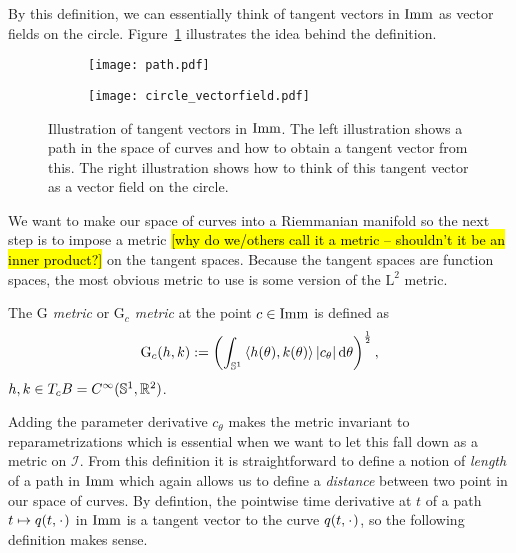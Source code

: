 By this definition, we can essentially think of tangent vectors in $\mathop{}\!\mathrm{Imm}$ as vector fields on the circle. Figure~\ref{fig:def-tang-imm} illustrates the idea behind the definition.

\begin{figure}
  \centering
  \begin{subfigure}{.49\textwidth}
    \centering
    \texttt{[image: path.pdf]}
  \end{subfigure}
  \begin{subfigure}{.49\textwidth}
    \centering
    \texttt{[image: circle\_vectorfield.pdf]}
  \end{subfigure}
  \caption{Illustration of tangent vectors in $\mathop{}\!\mathrm{Imm}$. The left illustration shows a path in the space of curves and how to obtain a tangent vector from this. The right illustration shows how to think of this tangent vector as a vector field on the circle.}
  \label{fig:def-tang-imm}
\end{figure}

We want to make our space of curves into a Riemmanian manifold so the next step is to impose a metric
\hl{[why do we/others call it a metric -- shouldn't it be an inner product?]}
on the tangent spaces. Because the tangent spaces are function spaces, the most obvious metric to use is some version of the $\mathrm{L}^2$ metric.

\begin{definition}
  The \textit{$\mathrm{G}$ metric} or \textit{$\mathrm{G}_c$ metric} at the point $c \in \mathop{}\!\mathrm{Imm}$ is defined as
  \begin{equation*}
    \mathrm{G}_c(h,k) :=
    \left(
      \int_{\mathbb{S}^{1}} \left\langle{h(\theta)
          , k(\theta)}\right\rangle |c_{\theta}| \mathop{}\!\mathrm{d} \theta
    \right)^{\frac{1}{2}},
  \end{equation*}
  $h,k \in T_cB = C^{\infty}(\mathbb{S}^1,\mathbb{R}^2)$.
\end{definition}

Adding the parameter derivative $c_{\theta}$ makes the metric invariant to reparametrizations which is essential when we want to let this fall down as a metric on $\mathcal{I}$. From this definition it is straightforward to define a notion of \textit{length} of a path in $\mathop{}\!\mathrm{Imm}$ which again allows us to define a \textit{distance} between two point in our space of curves. By defintion, the pointwise time derivative at $t$ of a path $t \mapsto q(t, \blank)$ in $\mathop{}\!\mathrm{Imm}$ is a tangent vector to the curve $q(t,\blank)$, so the following definition makes sense.

